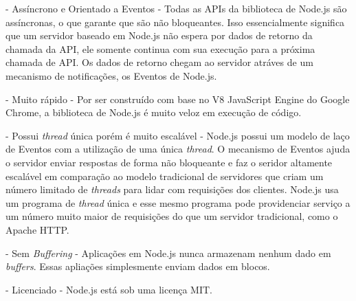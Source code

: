 \documentclass[a4paper,12pt]{article}
\begin{document}
- Assíncrono e Orientado a Eventos - Todas as APIs da biblioteca de Node.js são assíncronas, o que garante que são não bloqueantes. Isso essencialmente significa que um servidor baseado em Node.js não espera por dados de retorno da chamada da API, ele somente continua com sua execução para a próxima chamada de API. Os dados de retorno chegam ao servidor atráves de um mecanismo de notificações, os Eventos de Node.js. %


- Muito rápido - Por ser construído com base no V8 JavaScript Engine do Google Chrome, a biblioteca de Node.js é muito veloz em execução de código.

- Possui \emph{thread} única porém é muito escalável - Node.js possui um modelo de laço de Eventos com a utilização de uma única \emph{thread}. O mecanismo de Eventos ajuda o servidor enviar respostas de forma não bloqueante e faz o seridor altamente escalável em comparação ao modelo tradicional de servidores que criam um número limitado de \emph{threads} para lidar com requisições dos clientes. Node.js usa um programa de \emph{thread} única e esse mesmo programa pode providenciar serviço a um número muito maior de requisições do que um servidor tradicional, como o Apache HTTP.

- Sem \emph{Buffering} - Aplicações em Node.js nunca armazenam nenhum dado em \emph{buffers}. Essas apliações simplesmente enviam dados em blocos.

- Licenciado - Node.js está sob uma licença MIT.
\end{document}
